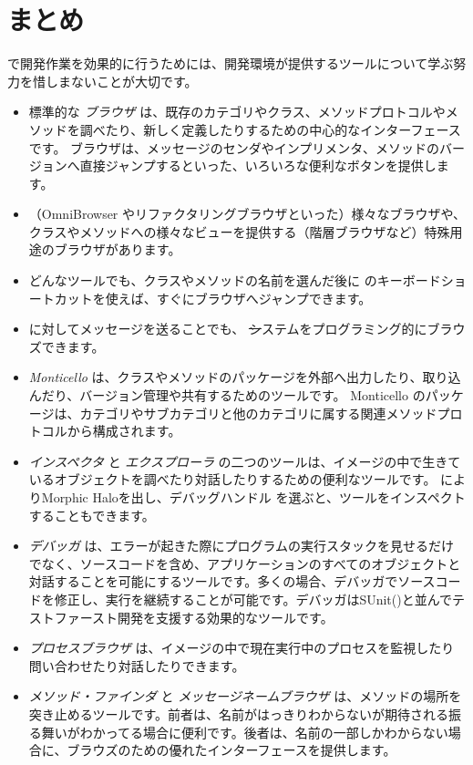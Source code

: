 \documentclass[a4paper,10pt,twoside]{book}
\begin{document}
\section{まとめ}

\pharo で開発作業を効果的に行うためには、開発環境が提供するツールについて学ぶ努力を惜しまないことが大切です。

\begin{itemize}
  \item 標準的な \emph{ブラウザ} は、既存のカテゴリやクラス、メソッドプロトコルやメソッドを調べたり、新しく定義したりするための中心的なインターフェースです。
    ブラウザは、メッセージのセンダやインプリメンタ、メソッドのバージョンへ直接ジャンプするといった、いろいろな便利なボタンを提供します。
  \item （OmniBrowser やリファクタリングブラウザといった）様々なブラウザや、クラスやメソッドへの様々なビューを提供する（階層ブラウザなど）特殊用途のブラウザがあります。
  \item どんなツールでも、クラスやメソッドの名前を選んだ後に  のキーボードショートカットを使えば、すぐにブラウザへジャンプできます。
  \item {} に対してメッセージを送ることでも、 \st システムをプログラミング的にブラウズできます。
  \item \emph{Monticello} は、クラスやメソッドのパッケージを外部へ出力したり、取り込んだり、バージョン管理や共有するためのツールです。
    Monticello のパッケージは、カテゴリやサブカテゴリと他のカテゴリに属する関連メソッドプロトコルから構成されます。
  \item \emph{インスペクタ} と \emph{エクスプローラ} の二つのツールは、イメージの中で生きているオブジェクトを調べたり対話したりするための便利なツールです。
     によりMorphic Haloを出し、デバッグハンドル \debugHandle を選ぶと、ツールをインスペクトすることもできます。
  \item \emph{デバッガ} は、エラーが起きた際にプログラムの実行スタックを見せるだけでなく、ソースコードを含め、アプリケーションのすべてのオブジェクトと対話することを可能にするツールです。多くの場合、デバッガでソースコードを修正し、実行を継続することが可能です。デバッガはSUnit()と並んでテストファースト開発を支援する効果的なツールです。
  \item \emph{プロセスブラウザ} は、イメージの中で現在実行中のプロセスを監視したり問い合わせたり対話したりできます。
  \item \emph{メソッド・ファインダ} と \emph{メッセージネームブラウザ} は、メソッドの場所を突き止めるツールです。前者は、名前がはっきりわからないが期待される振る舞いがわかってる場合に便利です。後者は、名前の一部しかわからない場合に、ブラウズのための優れたインターフェースを提供します。

\end{itemize}
\end{document}
